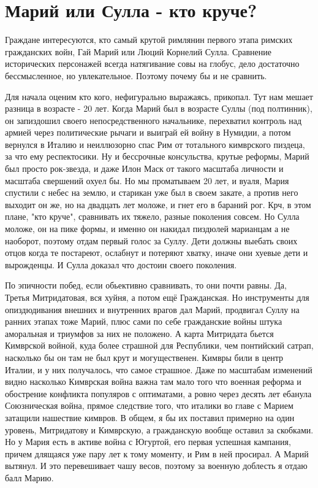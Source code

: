 \chapter{Марий или Сулла - кто круче?}

Граждане интересуются, кто самый крутой римлянин первого этапа римских гражданских войн, Гай Марий или Люций Корнелий Сулла. Сравнение исторических персонажей всегда натягивание совы на глобус, дело достаточно бессмысленное, но увлекательное. Поэтому почему бы и не сравнить.


Для начала оценим кто кого, нефигурально выражаясь, прикопал. Тут нам мешает разница в возрасте - 20 лет. Когда Марий был в возрасте Суллы (под полтинник), он запиздошил своего непосредственного начальнике, перехватил контроль над армией через политические рычаги и выиграй ей войну в Нумидии, а потом вернулся в Италию и неиллюзорно спас Рим от тотального кимврского пиздеца, за что ему респектосики. Ну и бессрочные консульства, крутые реформы, Марий был просто рок-звезда, и даже Илон Маск от такого масштаба личности и масштаба свершений охуел бы. Но мы проматываем 20 лет, и вуаля, Мария спустили с небес на землю, и старикан уже был в своем закате, а против него выходит он же, но на двадцать лет моложе, и гнет его в бараний рог. Крч, в этом плане, "кто круче", сравнивать их тяжело, разные поколения совсем. Но Сулла моложе, он на пике формы, и именно он накидал пиздюлей марианцам а не наоборот, поэтому отдам первый голос за Суллу. Дети должны выебать своих отцов когда те постареют, ослабнут и потеряют хватку, иначе они хуевые дети и вырожденцы. И Сулла доказал что достоин своего поколения.


По эпичности побед, если обьективно сравнивать, то они почти равны. Да, Третья Митридатовая, вся хуйня, а потом ещё Гражданская. Но инструменты для опиздюдивания внешних и внутренних врагов дал Марий, продвигал Суллу на ранних этапах тоже Марий, плюс сами по себе гражданские войны штука аморальная и триумфов за них не положено. А карта Митридата бьется Кимврской войной, куда более страшной для Республики, чем понтийский сатрап, насколько бы он там не был крут и могущественен. Кимвры били в центр Италии, и у них получалось, что самое страшное. Даже по масштабам изменений видно насколько Кимврская война важна там мало того что военная реформа и обострение конфликта популяров с оптиматами, а ровно через десять лет ебанула Союзническая война, прямое следствие того, что италики во главе с Марием затащили нашествие кимвров. В общем, я бы их поставил примерно на один уровень, Митридатову и Кимврскую, а гражданскую вообще оставил за скобками. Но у Мария есть в активе война с Югуртой, его первая успешная кампания, причем длящаяся уже пару лет к тому моменту, и Рим в ней просирал. А Марий вытянул. И это перевешивает чашу весов, поэтому за военную доблесть я отдаю балл Марию.


